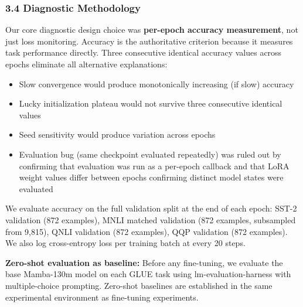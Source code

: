 \subsubsection{3.4 Diagnostic Methodology}

Our core diagnostic design choice was \textbf{per-epoch accuracy measurement}, not just loss monitoring. Accuracy is the authoritative criterion because it measures task performance directly. Three consecutive identical accuracy values across epochs eliminate all alternative explanations:
\begin{itemize}
\item Slow convergence would produce monotonically increasing (if slow) accuracy
\item Lucky initialization plateau would not survive three consecutive identical values
\item Seed sensitivity would produce variation across epochs
\item Evaluation bug (same checkpoint evaluated repeatedly) was ruled out by confirming that evaluation was run as a per-epoch callback and that LoRA weight values differ between epochs confirming distinct model states were evaluated
\end{itemize}

We evaluate accuracy on the full validation split at the end of each epoch: SST-2 validation (872 examples), MNLI matched validation (872 examples, subsampled from 9,815), QNLI validation (872 examples), QQP validation (872 examples). We also log cross-entropy loss per training batch at every 20 steps.

\textbf{Zero-shot evaluation as baseline:} Before any fine-tuning, we evaluate the base Mamba-130m model on each GLUE task using lm-evaluation-harness with multiple-choice prompting. Zero-shot baselines are established in the same experimental environment as fine-tuning experiments.

